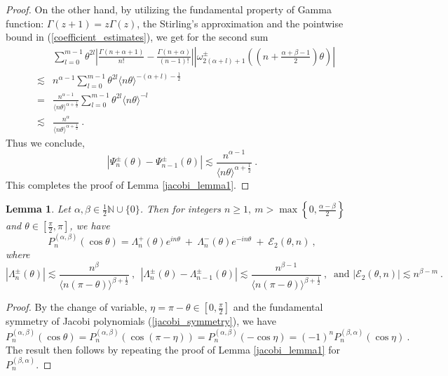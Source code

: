 \documentclass[12pt]{amsart}
\newtheorem{lemma}[theorem]{Lemma}
\theoremstyle{definition}
\newcommand{\N}{\mathbb N}%
\numberwithin{equation}{section}
\begin{document}
\begin{proof}
On the other hand, by utilizing the fundamental property of Gamma function: $\Gamma(z+1)=z\Gamma(z)$, the Stirling's approximation and the pointwise bound in (\ref{coefficient_estimates}), we get for the second sum
\begin{eqnarray*}
&&\sum_{l=0}^{m-1} \theta^{2l}\left|\frac{\Gamma(n+\alpha+1)}{n!}-\frac{\Gamma(n+\alpha)}{(n-1)!}\right|\left|\omega^\pm_{2(\alpha + l)+1}\left(\left(n+\frac{\alpha + \beta -1}{2}\right)\theta\right)\right| \\
&\lesssim & n^{\alpha -1} \sum_{l=0}^{m-1} \theta^{2l} \langle n\theta\rangle^{-(\alpha +l)-\frac{1}{2}} \\
&=& \frac{n^{\alpha -1}}{\langle n\theta\rangle^{\alpha + \frac{1}{2}}} \sum_{l=0}^{m-1} \theta^{2l} \langle n\theta\rangle^{-l} \\
&\lesssim & \frac{n^\alpha}{\langle n\theta\rangle^{\alpha + \frac{1}{2}}}\:.
\end{eqnarray*}
Thus we conclude,
\begin{equation*}
|\Psi^\pm_n(\theta) -\Psi^\pm_{n-1}(\theta)| \lesssim  \frac{n^{\alpha -1}}{\langle n\theta\rangle^{\alpha + \frac{1}{2}}}\:.
\end{equation*}
This completes the proof of Lemma \ref{jacobi_lemma1}.
\end{proof}

\begin{lemma} \label{jacobi_lemma2}
Let $\alpha,\beta \in \frac{1}{2}\N \cup \{0\}$. Then for integers $n \ge 1,\:m>\max \left\{0,\frac{\alpha - \beta}{2}\right\}$ and $\theta \in \left[\frac{\pi}{2},\pi\right]$, we have
\begin{equation*}
P^{(\alpha, \beta)}_n(\cos \theta)=\Lambda^+_n(\theta)e^{in\theta}\:+\:\Lambda^-_n(\theta)e^{-in\theta}\:+\:\mathcal{E}_2(\theta,n)\:,
\end{equation*}
where
\begin{equation*}
\left|\Lambda^\pm_n(\theta)\right|\lesssim \frac{n^\beta}{\langle n (\pi-\theta) \rangle^{\beta+\frac{1}{2}}}\:,\:\: \left|\Lambda^\pm_n(\theta)-\Lambda^\pm_{n-1}(\theta)\right|\lesssim \frac{n^{\beta-1}}{\langle n (\pi-\theta) \rangle^{\beta+\frac{1}{2}}}\:,\:\text{ and } \left|\mathcal{E}_2(\theta,n)\right| \lesssim n^{\beta-m}\:. 
\end{equation*}
\end{lemma}
\begin{proof}
By the change of variable, $\eta=\pi-\theta \in \left[0,\frac{\pi}{2}\right]$ and the fundamental symmetry of Jacobi polynomials (\ref{jacobi_symmetry}), we have
\begin{equation*}
P^{(\alpha,\beta)}_n(\cos \theta)=P^{(\alpha,\beta)}_n(\cos (\pi-\eta))=P^{(\alpha,\beta)}_n(-\cos \eta)=(-1)^n P^{(\beta,\alpha)}_n(\cos \eta)\:.
\end{equation*}
The result then follows by repeating the proof of Lemma \ref{jacobi_lemma1} for $P^{(\beta,\alpha)}_n$.
\end{proof}
\end{document}
